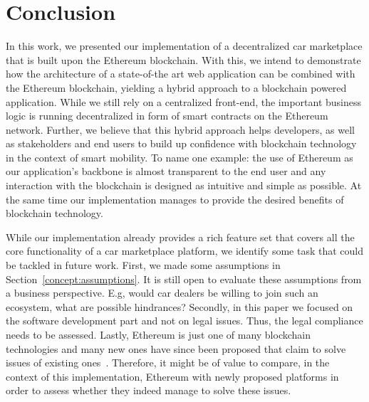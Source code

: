 \section{Conclusion} \label{sec:conclusion}

In this work, we presented our implementation of a decentralized car marketplace that is built upon the Ethereum blockchain. With this, we intend to demonstrate how the architecture of a state-of-the art web application can be combined with the Ethereum blockchain, yielding a hybrid approach to a blockchain powered application. While we still rely on a centralized front-end, the important business logic is running decentralized in form of smart contracts on the Ethereum network. Further, we believe that this hybrid approach helps developers, as well as stakeholders and end users to build up confidence with blockchain technology in the context of smart mobility. To name one example: the use of Ethereum as our application's backbone is almost transparent to the end user and any interaction with the blockchain is designed as intuitive and simple as possible. At the same time our implementation manages to provide the desired benefits of blockchain technology.

While our implementation already provides a rich feature set that covers all the core functionality of a car marketplace platform, we identify some task that could be tackled in future work. First, we made some assumptions in Section~\ref{concept:assumptions}. It is still open to evaluate these assumptions from a business perspective. E.g, would car dealers be willing to join such an ecosystem, what are possible hindrances?
Secondly, in this paper we focused on the software development part and not on legal issues. Thus, the legal compliance needs to be assessed. Lastly, Ethereum is just one of many blockchain technologies and many new ones have since been proposed that claim to solve issues of existing ones~\cite{NeoWhitePaper, EOSWhitePaper}. Therefore, it might be of value to compare, in the context of this implementation, Ethereum with newly proposed platforms in order to assess whether they indeed manage to solve these issues.
